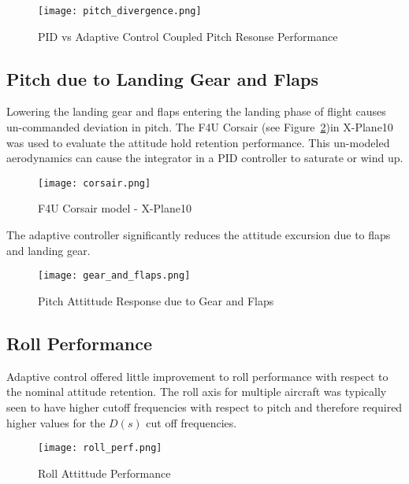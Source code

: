 \begin{figure}[h!]
 \centering
  \texttt{[image: pitch\_divergence.png]}
  \caption{PID vs \Lone Adaptive Control Coupled Pitch Resonse Performance}
  \label{fig:pitch_divergence}
\end{figure}

\subsection{Pitch due to Landing Gear and Flaps}
Lowering the landing gear and flaps entering the landing phase of flight causes un-commanded deviation in pitch.  The F4U Corsair (see Figure~\ref{fig:corsair})in X-Plane10 was used to evaluate the attitude hold retention performance.  This un-modeled aerodynamics can cause the integrator in a \ac{PID} controller to saturate or wind up. 

\begin{figure}[h!]
 \centering
  \texttt{[image: corsair.png]}
  \caption{F4U Corsair model - X-Plane10}
  \label{fig:corsair}
\end{figure}

The \Lone adaptive controller significantly reduces the attitude excursion due to flaps and landing gear.
\begin{figure}[h!]
 \centering
  \texttt{[image: gear\_and\_flaps.png]}
  \caption{Pitch Attittude Response due to Gear and Flaps}
  \label{fig:gear_and_flaps}
\end{figure}

\subsection{Roll Performance}
Adaptive control offered little improvement to roll performance with respect to the nominal attitude retention.  The roll axis for multiple aircraft was typically seen to have higher cutoff frequencies with respect to pitch and therefore required higher values for the $D(s)$ cut off frequencies.
\begin{figure}[h!]
 \centering
  \texttt{[image: roll\_perf.png]}
  \caption{Roll Attittude Performance}
  \label{fig:roll_perf}
\end{figure}

